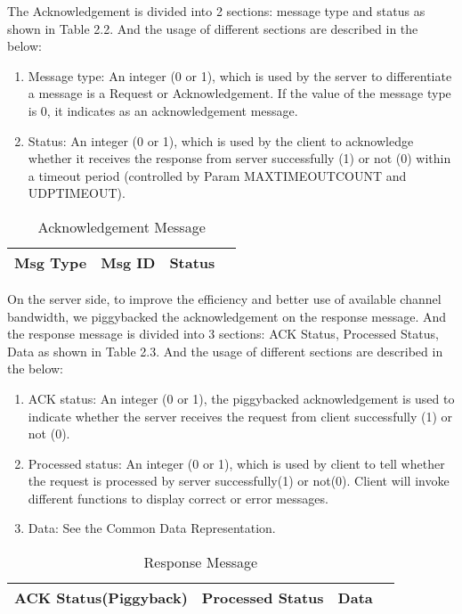 \begin{spacing}{1}
The Acknowledgement is divided into 2 sections: message type and status as shown in Table 2.2. And the usage of different sections are described in the below:
\begin{enumerate}
    \item Message type: An integer (0 or 1), which is used by the server to differentiate a message is a Request or Acknowledgement. If the value of the message type is 0, it indicates as an acknowledgement message. 
    \item Status: An integer (0 or 1), which is used by the client to acknowledge whether it receives the response from server successfully (1) or not (0) within a timeout period (controlled by Param MAXTIMEOUTCOUNT and UDPTIMEOUT).
\end{enumerate}

\begin{table}[h!]
\centering
\begin{tabular}{|l|l|l|l|}
\hline
Msg Type & Msg ID & Status \\ \hline
\end{tabular}
\caption{Acknowledgement Message}
\end{table}


On the server side, to improve the efficiency and better use of available channel bandwidth, we piggybacked the acknowledgement on the response message. And the response message is divided into 3 sections: ACK Status, Processed Status, Data as shown in Table 2.3. And the usage of different sections are described in the below:
\begin{enumerate}
    \item ACK status: An integer (0 or 1), the piggybacked acknowledgement is used to indicate whether the server receives the request from client successfully (1) or not (0).
    \item Processed status: An integer (0 or 1), which is used by client to tell whether the request is processed by server successfully(1) or not(0). Client will invoke different functions to display correct or error messages.
    \item Data: See the Common Data Representation.
\end{enumerate}

\begin{table}[h!]
\centering
\begin{tabular}{|l|l|l|l|}
\hline
ACK Status(Piggyback) & Processed Status & Data \\ \hline
\end{tabular}
\caption{Response Message}
\end{table}



\end{spacing}
